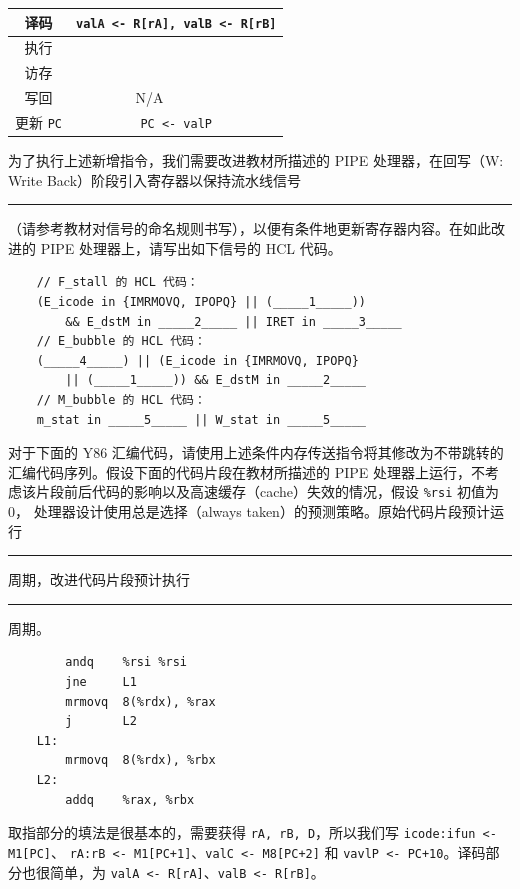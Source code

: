 \begin{problems}
\begin{table}[H]
\begin{tabular}{|c|c|c|}
                译码 & \multicolumn{2}{c|}{\texttt{valA <- R[rA], valB <- R[rB]}} \\ \hline
                执行 & \rule{0pt}{8ex} & \rule{0pt}{8ex} \\ \hline
                访存 & \rule{0pt}{8ex} & \rule{0pt}{8ex} \\ \hline
                写回 & N/A & \rule{0pt}{8ex} \\ \hline
                更新 \verb|PC| & \multicolumn{2}{c|}{\texttt{PC <- valP}} \\ \hline
            \end{tabular}
        \end{table}
        \qn 为了执行上述新增指令，我们需要改进教材所描述的 PIPE 处理器，在回写（W: Write Back）阶段引入寄存器以保持流水线信号 \rule{2.5cm}{0.25mm} （请参考教材对信号的命名规则书写），以便有条件地更新寄存器内容。在如此改进的 PIPE 处理器上，请写出如下信号的 HCL 代码。
        \begin{verbatim}
    // F_stall 的 HCL 代码：
    (E_icode in {IMRMOVQ, IPOPQ} || (_____1_____))
        && E_dstM in _____2_____ || IRET in _____3_____
    // E_bubble 的 HCL 代码：
    (_____4_____) || (E_icode in {IMRMOVQ, IPOPQ}
        || (_____1_____)) && E_dstM in _____2_____
    // M_bubble 的 HCL 代码：
    m_stat in _____5_____ || W_stat in _____5_____
        \end{verbatim}
        \qn 对于下面的 Y86 汇编代码，请使用上述条件内存传送指令将其修改为不带跳转的汇编代码序列。假设下面的代码片段在教材所描述的 PIPE 处理器上运行，不考虑该片段前后代码的影响以及高速缓存（cache）失效的情况，假设 \verb|%rsi| 初值为 0， 处理器设计使用总是选择（always taken）的预测策略。原始代码片段预计运行 \rule{2.5cm}{0.25mm} 周期，改进代码片段预计执行 \rule{2.5cm}{0.25mm} 周期。
        \begin{verbatim}
        andq    %rsi %rsi
        jne     L1
        mrmovq  8(%rdx), %rax
        j       L2
    L1:
        mrmovq  8(%rdx), %rbx
    L2:
        addq    %rax, %rbx
        \end{verbatim}
        \sol 取指部分的填法是很基本的，需要获得 \verb|rA, rB, D|，所以我们写 \verb|icode:ifun <- M1[PC]|、 \verb|rA:rB <- M1[PC+1]|、\verb|valC <- M8[PC+2]| 和 \verb|vavlP <- PC+10|。译码部分也很简单，为 \verb|valA <- R[rA]|、\verb|valB <- R[rB]|。
        

\end{problems}
